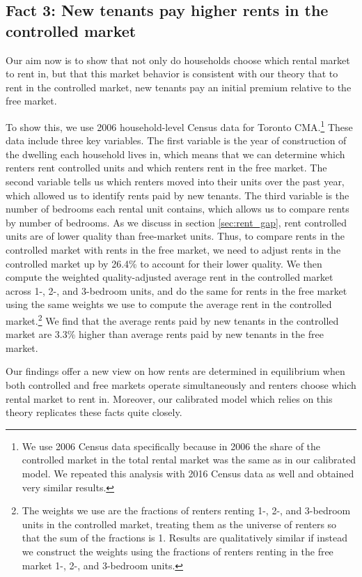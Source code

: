 \documentclass[parskip=full]{article}
\begin{document}
\subsection{Fact 3: New tenants pay higher rents in the controlled market}\label{sec:rent_premium} Our aim now is to show that not only do households choose which rental market to rent in, but that this market behavior is consistent with our theory that to rent in the controlled market, new tenants pay an initial premium relative to the free market. 

To show this, we use 2006 household-level Census data for Toronto CMA.\footnote{We use 2006 Census data specifically because in 2006 the share of the controlled market in the total rental market was the same as in our calibrated model. We repeated this analysis with 2016 Census data as well and obtained very similar results.} These data include three key variables. The first variable is the year of construction of the dwelling each household lives in, which means that we can determine which renters rent controlled units and which renters rent in the free market. The second variable tells us which renters moved into their units over the past year, which allowed us to identify rents paid by new tenants. The third variable is the number of bedrooms each rental unit contains, which allows us to compare rents by number of bedrooms. As we discuss in section \ref{sec:rent_gap}, rent controlled units are of lower quality than free-market units. Thus, to compare rents in the controlled market with rents in the free market, we  need to adjust rents in the controlled market up by 26.4\% to account for their lower quality. We then compute the weighted quality-adjusted average rent in the controlled market across 1-, 2-, and 3-bedroom units, and do the same for rents in the free market using the same weights we use to compute the average rent in the controlled market.\footnote{The weights we use are the fractions of renters renting 1-, 2-, and 3-bedroom units in the controlled market, treating them as the universe of renters so that the sum of the fractions is 1. Results are qualitatively similar if instead we construct the weights using the fractions of renters renting in the free market 1-, 2-, and 3-bedroom units.} We find that the average rents paid by new tenants in the controlled market are 3.3\% higher than average rents paid by new tenants in the free market. 

Our findings offer a new view on how rents are determined in equilibrium when both controlled and free markets operate simultaneously and renters choose which rental market to rent in. Moreover, our calibrated model which relies on this theory replicates these facts quite closely.
\end{document}
